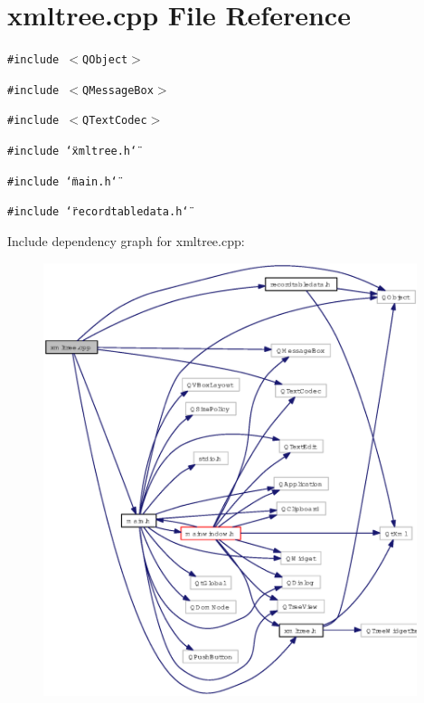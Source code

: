 \section{xmltree.cpp File Reference}
\label{xmltree_8cpp}
{\tt \#include $<$QObject$>$}\par
{\tt \#include $<$QMessage\-Box$>$}\par
{\tt \#include $<$QText\-Codec$>$}\par
{\tt \#include \char`\"{}xmltree.h\char`\"{}}\par
{\tt \#include \char`\"{}main.h\char`\"{}}\par
{\tt \#include \char`\"{}recordtabledata.h\char`\"{}}\par


Include dependency graph for xmltree.cpp:\begin{figure}[H]
\begin{center}
\leavevmode
\includegraphics[width=310pt]{xmltree_8cpp__incl}
\end{center}
\end{figure}
